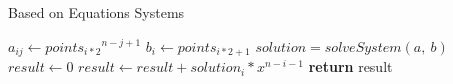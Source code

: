 \documentclass{article}
\begin{document}
  \begin{algorithm}
    \caption{Based on Equations Systems}
    \begin{algorithmic}[1]
            \State $a_{ij} \gets {points_{i*2}}^{n - j + 1}$
          \EndFor
          \State $b_{i} \gets points_{i * 2 + 1}$
        \EndFor
        \State $solution = solveSystem(a,\ b)$
        \State $result \gets 0$
          \State $result \gets result + solution_{i} * x^{n - i - 1}$
        \EndFor
        \State \textbf{return} result
      \EndProcedure
    \end{algorithmic}
  \end{algorithm}
\end{document}

